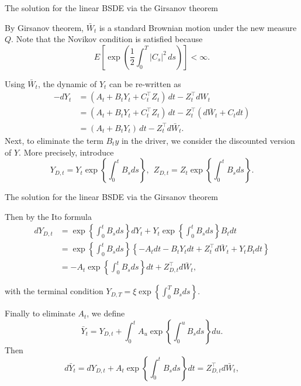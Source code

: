 \documentclass{beamer}
\begin{document}
\begin{frame}{The solution for the linear BSDE via the Girsanov theorem}

    {\footnotesize \footnotesize
   By Girsanov theorem, \(\bar{W}_{t}\) is a standard Brownian motion under the new measure \(Q\). Note that the Novikov condition is satisfied because
\[
E\left[\exp\left(\frac{1}{2}\int_{0}^{T}|C_{s}|^{2}\,ds\right)\right]<\infty.
\]

Using \(\bar{W}_{t}\), the dynamic of \(Y_{t}\) can be re-written as
\begin{align*}
    -dY_{t} &= (A_{t}+B_{t}Y_{t}+C_{t}^{\top}Z_{t})\,dt-Z_{t}^{\top}dW_{t}\\
    &= (A_{t}+B_{t}Y_{t}+C_{t}^{\top}Z_{t})\,dt-Z_{t}^{\top}(d\bar{W}_{t}+ C_{t}dt)\\
    &= (A_{t}+B_{t}Y_{t})\,dt-Z_{t}^{\top}d\bar{W}_{t}.
\end{align*}
Next, to eliminate the term \(B_{t}y\) in the driver, we consider the discounted version of \(Y\). More precisely, introduce
\[
Y_{D,t}=Y_{t}\exp\left\{\int_{0}^{t}B_{s}ds\right\},\ \ Z_{D,t}=Z_{t}\exp\left\{ \int_{0}^{t}B_{s}ds\right\}.
\]

    }
    
\end{frame}

\begin{frame}{The solution for the linear BSDE via the Girsanov theorem}

    {\footnotesize \footnotesize
    Then by the Ito formula
    \begin{align*}
        dY_{D,t} &= \exp\left\{\int_{0}^{t}B_{s}ds\right\}dY_{t}
        +Y_{t}\exp\left\{\int_ {0}^{t}B_{s}ds\right\}B_{t}dt\\
        &= \exp\left\{\int_{0}^{t}B_{s}ds\right\}\left\{-A_{t}dt
        -B_{t}Y_{t}dt +Z_{t}^{\top}d\bar{W}_{t}+Y_{t}B_{t}dt\right\}\\
        & = -A_{t}\exp\left\{\int_{0}^{t}B_{s}ds\right\}dt+Z_{D,t}^{\top}d \bar{W}_{t},
    \end{align*}
\par with the terminal condition $Y_{D,T}=\xi\exp\left\{\int_{0}^{T}B_{s}ds\right\}.$
\par Finally to eliminate \(A_{t}\), we define
\[
\bar{Y}_{t}=Y_{D,t}+\int_{0}^{t}A_{u}\exp\left\{\int_{0}^{u}B_{s}ds\right\}du.
\]
Then
\[
d\bar{Y}_{t} = dY_{D,t}+A_{t}\exp\left\{\int_{0}^{t}B_{s}ds\right\}dt= Z_{D,t}^{\top}d\bar{W}_{t},
\]

    }
    
\end{frame}
\end{document}
